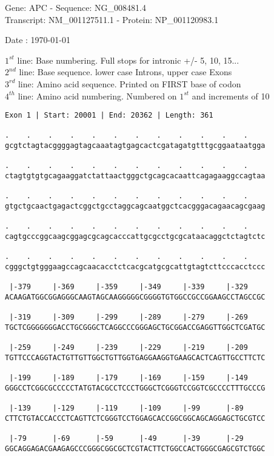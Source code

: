\documentclass{article}
\begin{document}
\begin{center}
\begin{large}
Gene: APC - Sequence: NG\_008481.4\\
Transcript: NM\_001127511.1 - Protein: NP\_001120983.1
 
 Date : \today
\end{large}
\end{center}
$1^{st}$ line: Base numbering. Full stops for intronic +/- 5, 10, 15...\\
$2^{nd}$ line: Base sequence. lower case Introns, upper case Exons\\
$3^{rd}$ line: Amino acid sequence. Printed on FIRST base of codon\\
$4^{th}$ line: Amino acid numbering. Numbered on $1^{st}$ and increments of 10\\
\begin{Verbatim}[fontfamily=courier]
Exon 1 | Start: 20001 | End: 20362 | Length: 361

.    .    .    .    .    .    .    .    .    .    .    .    
gcgtctagtacggggagtagcaaatagtgagcactcgatagatgtttgcggaataatgga

.    .    .    .    .    .    .    .    .    .    .    .    
ctagtgtgtgcagaaggatctattaactgggctgcagcacaattcagagaaggccagtaa

.    .    .    .    .    .    .    .    .    .    .    .    
gtgctgcaactgagactcggctgcctaggcagcaatggctcacgggacagaacagcgaag

.    .    .    .    .    .    .    .    .    .    .    .    
cagtgcccggcaagcggagcgcagcacccattgcgcctgcgcataacaggctctagtctc

.    .    .    .    .    .    .    .    .    .    .    .    
cgggctgtgggaagccagcaacacctctcacgcatgcgcattgtagtcttcccacctccc

 |-379     |-369     |-359     |-349     |-339     |-329    
ACAAGATGGCGGAGGGCAAGTAGCAAGGGGGCGGGGTGTGGCCGCCGGAAGCCTAGCCGC

 |-319     |-309     |-299     |-289     |-279     |-269    
TGCTCGGGGGGGACCTGCGGGCTCAGGCCCGGGAGCTGCGGACCGAGGTTGGCTCGATGC

 |-259     |-249     |-239     |-229     |-219     |-209    
TGTTCCCAGGTACTGTTGTTGGCTGTTGGTGAGGAAGGTGAAGCACTCAGTTGCCTTCTC

 |-199     |-189     |-179     |-169     |-159     |-149    
GGGCCTCGGCGCCCCCTATGTACGCCTCCCTGGGCTCGGGTCCGGTCGCCCCTTTGCCCG

 |-139     |-129     |-119     |-109     |-99      |-89     
CTTCTGTACCACCCTCAGTTCTCGGGTCCTGGAGCACCGGCGGCAGCAGGAGCTGCGTCC

 |-79      |-69      |-59      |-49      |-39      |-29     
GGCAGGAGACGAAGAGCCCGGGCGGCGCTCGTACTTCTGGCCACTGGGCGAGCGTCTGGC

\end{Verbatim}
\end{document}
